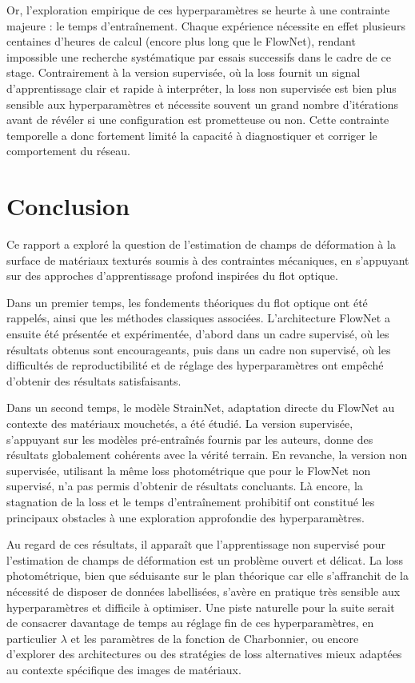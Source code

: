 \documentclass{magnolia}
\begin{document}
Or, l'exploration empirique de ces hyperparamètres se heurte à une contrainte majeure : le temps d'entraînement. Chaque expérience nécessite en effet plusieurs centaines d'heures de calcul (encore plus long que le FlowNet), rendant impossible une recherche systématique par essais successifs dans le cadre de ce stage. Contrairement à la version supervisée, où la loss fournit un signal d'apprentissage clair et rapide à interpréter, la loss non supervisée est bien plus sensible aux hyperparamètres et nécessite souvent un grand nombre d'itérations avant de révéler si une configuration est prometteuse ou non. Cette contrainte temporelle a donc fortement limité la capacité à diagnostiquer et corriger le comportement du réseau.


\section{Conclusion}

Ce rapport a exploré la question de l'estimation de champs de déformation à la surface de matériaux texturés soumis à des contraintes mécaniques, en s'appuyant sur des approches d'apprentissage profond inspirées du flot optique.

Dans un premier temps, les fondements théoriques du flot optique ont été rappelés, ainsi que les méthodes classiques associées. L'architecture FlowNet a ensuite été présentée et expérimentée, d'abord dans un cadre supervisé, où les résultats obtenus sont encourageants, puis dans un cadre non supervisé, où les difficultés de reproductibilité et de réglage des hyperparamètres ont empêché d'obtenir des résultats satisfaisants.

Dans un second temps, le modèle StrainNet, adaptation directe du FlowNet au contexte des matériaux mouchetés, a été étudié. La version supervisée, s'appuyant sur les modèles pré-entraînés fournis par les auteurs, donne des résultats globalement cohérents avec la vérité terrain. En revanche, la version non supervisée, utilisant la même loss photométrique que pour le FlowNet non supervisé, n'a pas permis d'obtenir de résultats concluants. Là encore, la stagnation de la loss et le temps d'entraînement prohibitif ont constitué les principaux obstacles à une exploration approfondie des hyperparamètres.

Au regard de ces résultats, il apparaît que l'apprentissage non supervisé pour l'estimation de champs de déformation est un problème ouvert et délicat. La loss photométrique, bien que séduisante sur le plan théorique car elle s'affranchit de la nécessité de disposer de données labellisées, s'avère en pratique très sensible aux hyperparamètres et difficile à optimiser. Une piste naturelle pour la suite serait de consacrer davantage de temps au réglage fin de ces hyperparamètres, en particulier $\lambda$ et les paramètres de la fonction de Charbonnier, ou encore d'explorer des architectures ou des stratégies de loss alternatives mieux adaptées au contexte spécifique des images de matériaux.
\end{document}
